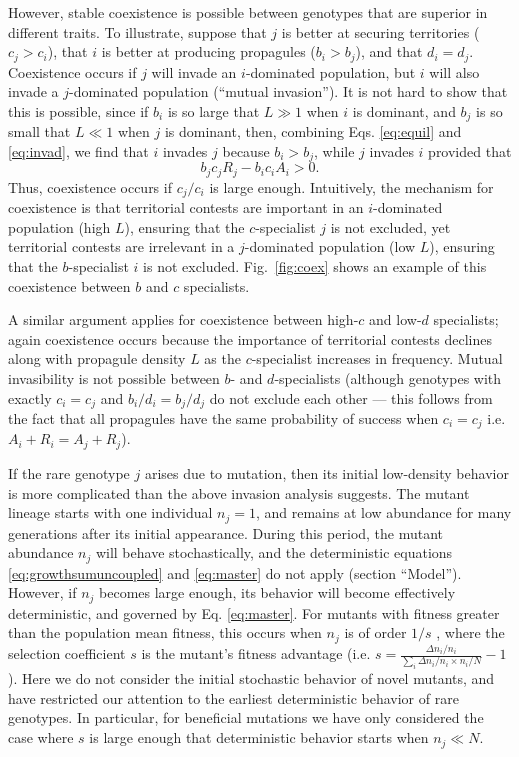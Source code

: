 \documentclass[11pt]{article}
\begin{document}
However, stable coexistence is possible between genotypes that are superior in different traits. To illustrate, suppose that $j$ is better at securing territories ($c_j>c_i$), that $i$ is better at producing propagules ($b_i>b_j$), and that $d_i=d_j$. Coexistence occurs if $j$ will invade an $i$-dominated population, but $i$ will also invade a $j$-dominated population (``mutual invasion''). It is not hard to show that this is possible, since if $b_i$ is so large that $L\gg 1$ when $i$ is dominant, and $b_j$ is so small that $L\ll 1$ when $j$ is dominant, then, combining Eqs. \eqref{eq:equil} and \eqref{eq:invad}, we find that $i$ invades $j$ because $b_i>b_j$, while $j$ invades $i$ provided that
\begin{equation}
b_jc_jR_j-b_i c_i A_i>0. \label{eq:jinvadcoex}
\end{equation}
Thus, coexistence occurs if $c_j/c_i$ is large enough. Intuitively, the mechanism for coexistence is that territorial contests are important in an $i$-dominated population (high $L$), ensuring that the $c$-specialist $j$ is not excluded, yet territorial contests are irrelevant in a $j$-dominated population (low $L$), ensuring that the $b$-specialist $i$ is not excluded. Fig.~\ref{fig:coex} shows an example of this coexistence between $b$ and $c$ specialists. 

A similar argument applies for coexistence between high-$c$ and low-$d$ specialists; again coexistence occurs because the importance of territorial contests declines along with propagule density $L$ as the $c$-specialist increases in frequency. Mutual invasibility is not possible between $b$- and $d$-specialists (although genotypes with exactly $c_i=c_j$ and $b_i/d_i=b_j/d_j$ do not exclude each other --- this follows from the fact that all propagules have the same probability of success when $c_i=c_j$ i.e. $A_i+R_i=A_j+R_j$).

If the rare genotype $j$ arises due to mutation, then its initial low-density behavior is more complicated than the above invasion analysis suggests. The mutant lineage starts with one individual $n_j=1$, and remains at low abundance for many generations after its initial appearance. During this period, the mutant abundance $n_j$ will behave stochastically, and the deterministic equations \eqref{eq:growthsumuncoupled} and \eqref{eq:master} do not apply (section ``Model''). However, if $n_j$ becomes large enough, its behavior will become effectively deterministic, and governed by Eq. \eqref{eq:master}. For mutants with fitness greater than the population mean fitness, this occurs when $n_j$ is of order $1/s$ \citep{desai_2007}, where the selection coefficient $s$ is the mutant's fitness advantage (i.e. $s=\frac{\Delta n_i/n_i}{\sum_i\Delta n_i/n_i\times n_i/N}-1$). Here we do not consider the initial stochastic behavior of novel mutants, and have restricted our attention to the earliest deterministic behavior of rare genotypes. In particular, for beneficial mutations we have only considered the case where $s$ is large enough that deterministic behavior starts when $n_j \ll N$.
\end{document}
